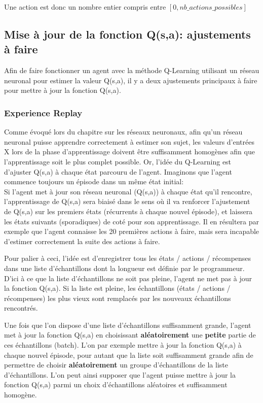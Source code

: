 \documentclass[11pt,a4paper]{report}
\begin{document}
  \par Une action est donc un nombre entier compris entre $[0, nb\_actions\_possibles]$

  \subsection{Mise à jour de la fonction Q(s,a): ajustements à faire}
  
   \par Afin de faire fonctionner un agent avec la méthode Q-Learning utilisant un réseau neuronal pour estimer la valeur Q(s,a), il y a deux ajustements principaux à faire pour mettre à jour la fonction Q(s,a). 
  
  \subsubsection{Experience Replay}
  
  \par Comme évoqué lors du chapitre sur les réseaux neuronaux, afin qu'un réseau neuronal puisse apprendre correctement à estimer son sujet, les valeurs d'entrées X lors de la phase d'apprentissage doivent être suffisamment homogènes afin que l'apprentissage soit le plus complet possible. Or, l'idée du Q-Learning est d'ajuster Q(s,a) à chaque état parcouru de l'agent. Imaginons que l'agent commence toujours un épisode dans un même état initial: \\
  Si l'agent met à jour son réseau neuronal (Q(s,a)) à chaque état qu'il rencontre, l'apprentissage de Q(s,a) sera biaisé dans le sens où il va renforcer l'ajustement de Q(s,a) sur les premiers états (récurrents à chaque nouvel épisode), et laissera les états suivants (sporadiques) de coté pour son apprentissage. Il en résultera par exemple que l'agent connaisse les 20 premières actions à faire, mais sera incapable d'estimer correctement la suite des actions à faire. 
  
  \par Pour palier à ceci, l'idée est d'enregistrer tous les états / actions / récompenses dans une liste d'échantillons dont la longueur est définie par le programmeur. D'ici à ce que la liste d'échantillons ne soit pas pleine, l'agent ne met pas à jour la fonction Q(s,a). Si la liste est pleine, les échantillons (états / actions / récompenses) les plus vieux sont remplacés par les nouveaux échantillons rencontrés. 
  
  \par Une fois que l'on dispose d'une liste d'échantillons suffisamment grande, l'agent met à jour la fonction Q(s,a) en choisissant \textbf{aléatoirement} une \textbf{petite} partie de ces échantillons (batch). L'on par exemple mettre à jour la fonction Q(s,a) à chaque nouvel épisode, pour autant que la liste soit suffisamment grande afin de permettre de choisir \textbf{aléatoirement} un groupe d'échantillons de la liste d'échantillons. L'on peut ainsi supposer que l'agent puisse mettre à jour la fonction Q(s,a) parmi un choix d'échantillons aléatoires et suffisamment homogène. 
  
\end{document}
